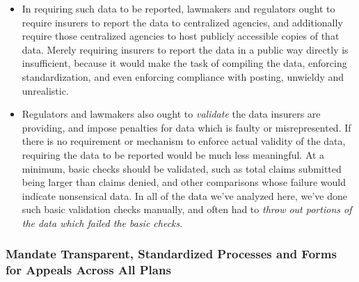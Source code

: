 \documentclass[12pt, a4paper,twoside,parskip=full]{report}
\theoremstyle{plain} %
\theoremstyle{definition} %
\theoremstyle{remark} %
\numberwithin{equation}{chapter}
\begin{document}
\begin{itemize}
			\item In requiring such data to be reported, lawmakers and regulators ought to require insurers to report the data to centralized agencies, and additionally require those centralized agencies to host publicly accessible copies of that data. Merely requiring insurers to report the data in a public way directly is insufficient, because it would make the task of compiling the data, enforcing standardization, and even enforcing compliance with posting, unwieldy and unrealistic.
			
			\item Regulators and lawmakers also ought to \emph{validate} the data insurers are providing, and impose penalties for data which is faulty or misrepresented. If there is no requirement or mechanism to enforce actual validity of the data, requiring the data to be reported would be much less meaningful. At a minimum, basic checks should be validated, such as total claims submitted being larger than claims denied, and other comparisons whose failure would indicate nonsensical data. In all of the data we've analyzed here, we've done such basic validation checks manually, and often had to \emph{throw out portions of the data which failed the basic checks}.
		\end{itemize}
		
		\subsubsection{Mandate Transparent, Standardized Processes and Forms for Appeals Across All Plans}
		
\end{document}
